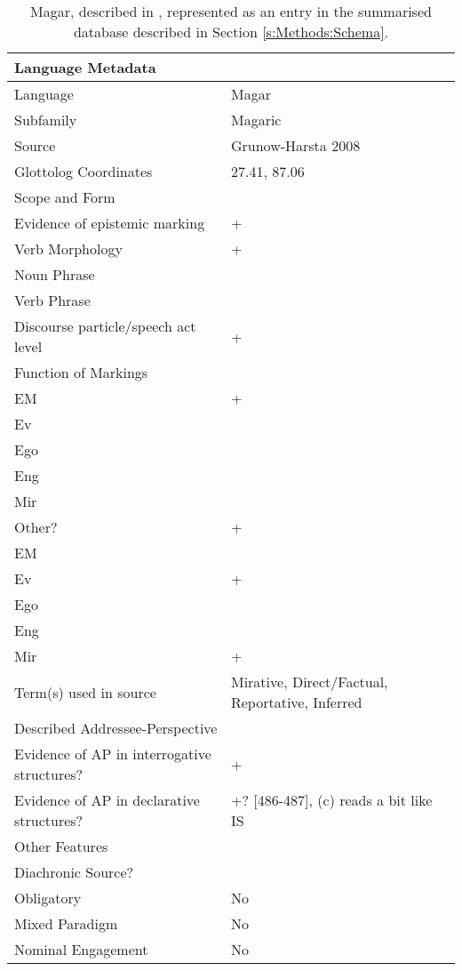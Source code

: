 \begin{table}
  \begin{tabular}{|l|l|}
  \hline\hline
  \multicolumn{2}{|l|}{Language Metadata} \\ \hline
  Language & Magar \\ \hline
  Subfamily & Magaric \\ \hline
  Source & Grunow-Harsta 2008 \\ \hline
  Glottolog Coordinates & 27.41, 87.06 \\ \hline \hline
  \multicolumn{2}{|l|}{Scope and Form} \\ \hline
  Evidence of epistemic marking & + \\ \hline
  Verb Morphology & + \\ \hline
  Noun Phrase &  \\ \hline
  Verb Phrase &  \\ \hline
  Discourse particle/speech act level & + \\ \hline \hline
  \multicolumn{2}{|l|}{Function of Markings} \\ \hline
  EM & + \\ \hline
  Ev &  \\ \hline
  Ego &  \\ \hline
  Eng &  \\ \hline
  Mir &  \\ \hline
  Other? & + \\ \hline \hline
  EM &  \\ \hline
  Ev & + \\ \hline
  Ego &  \\ \hline
  Eng &  \\ \hline
  Mir & + \\ \hline \hline
  Term(s) used in source & Mirative, Direct/Factual, Reportative, Inferred \\ \hline \hline
  \multicolumn{2}{|l|}{Described Addressee-Perspective} \\ \hline
  Evidence of AP in interrogative structures? & + \\ \hline
  Evidence of AP in declarative structures? & +? {[}486-487{]}, (c) reads a bit like IS \\ \hline \hline
  \multicolumn{2}{|l|}{Other Features} \\ \hline
  Diachronic Source? &  \\ \hline
  Obligatory & No \\ \hline 
  Mixed Paradigm & No \\ \hline
  Nominal Engagement & No \\ \hline \hline
  \end{tabular}
  \caption{Magar, described in , represented as an entry in the summarised database described in Section \ref{s:Methods:Schema}.}\label{t:Methods:SchemaExample}
  \end{table}
